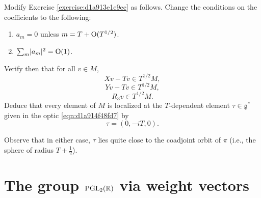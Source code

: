 \documentclass[reqno]{amsart} 
\numberwithin{equation}{section}
\numberwithin{theorem}{section}
\begin{document}
\begin{exercise}
  Modify Exercise \ref{exercise:d1a913e1e9ec} as follows.  Change the conditions on the coefficients to the following:
  \begin{enumerate}
  \item $a_m = 0$ unless $m = T + \operatorname{O}(T^{1/2})$.
  \item $\sum_m \lvert a_m \rvert^2 = \operatorname{O}(1)$.
  \end{enumerate}
  Verify then that for all $v \in M$,
  \begin{equation*}
    X v - T v \in T^{1/2} M,
  \end{equation*}
  \begin{equation*}
    Y v - T v \in T^{1/2} M,
  \end{equation*}
  \begin{equation*}
    R_3 v \in T^{1/2} M.
  \end{equation*}
  Deduce that every element of $M$ is localized at the $T$-dependent element $\tau \in \mathfrak{g}^*$ given in the optic \eqref{eqn:d1a914f48fd7} by
  \begin{equation*}
\tau = (0,-iT,0).
\end{equation*}
\end{exercise}

Observe that in either case, $\tau$ lies quite close to the coadjoint orbit of $\pi$ (i.e., the sphere of radius $T + \tfrac{1}{2}$).



\section{The group $\operatorname{PGL}_2(\mathbb{R}\label{sec:d1a9162eb3c7})$ via weight vectors}
\end{document}
